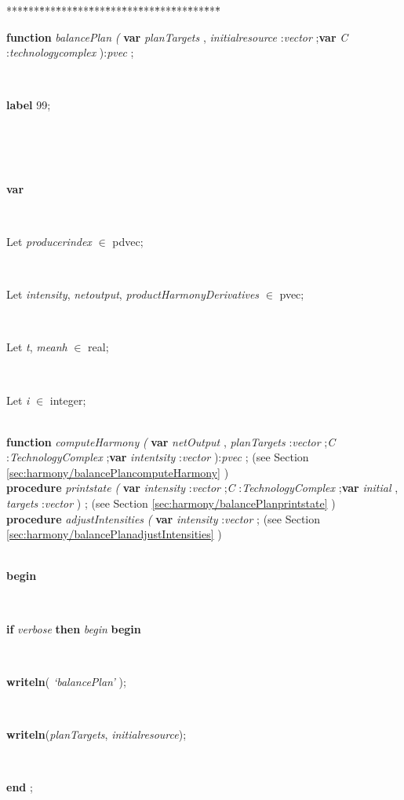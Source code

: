\begin{tabbing}
***\=***\=***\=***\=***\=***\=***\=***\=***\=***\=***\=***\=***\=\kill
\parbox{14cm}{\textsf{\textbf{function}  \textit{balancePlan} \textit{(}   \textbf{var}   \textit{planTargets} , \textit{initialresource} :\textit{vector}  ;\textbf{var}  \textit{C} :\textit{technologycomplex} ):\textit{pvec} ;}}\\
\parbox{14cm}{\textsf{\textbf{label}  99;}}\\
\\
\\
\+\parbox{14cm}{\textsf{\textbf{var} }}\\
\parbox{14cm}{\textsf{Let \textit{producerindex} $\in$ pdvec;}}\\
\parbox{14cm}{\textsf{Let \textit{intensity}, \textit{netoutput}, \textit{productHarmonyDerivatives} $\in$ pvec;}}\\
\parbox{14cm}{\textsf{Let \textit{t}, \textit{meanh} $\in$ real;}}\\
\parbox{14cm}{\textsf{Let \textit{i} $\in$ integer;}}\\
\<\textsf{\textbf{function}   \textit{computeHarmony}  \textit{(} \textbf{var}  \textit{netOutput} ,  \textit{planTargets} :\textit{vector} ;\textit{C} :\textit{TechnologyComplex}  ;\textbf{var}   \textit{intentsity} :\textit{vector}  ):\textit{pvec} ;} (see Section \ref{sec:harmony/balancePlancomputeHarmony} )\\
\<\textsf{\textbf{procedure}  \textit{printstate} \textit{(} \textbf{var}  \textit{intensity} :\textit{vector} ;\textit{C} :\textit{TechnologyComplex} ;\textbf{var}   \textit{initial} ,  \textit{targets} :\textit{vector} ) ;} (see Section \ref{sec:harmony/balancePlanprintstate} )\\
\<\textsf{\textbf{procedure}  \textit{adjustIntensities} \textit{(} \textbf{var}  \textit{intensity} :\textit{vector} ;} (see Section \ref{sec:harmony/balancePlanadjustIntensities} )\\
\\
\-\<\+\parbox{14cm}{\textsf{\textbf{begin} }}\\
\+\<\parbox{14cm}{\textsf {\textbf {if } \textsf{\textit{verbose}} \textbf{ then } \textsf{\textit{begin}} \textbf{ begin } }}\\
\parbox{14cm}{\textsf{\textbf{writeln}(\textit{\textrm{\textup { `balancePlan' } }})}; }\\
\parbox{14cm}{\textsf{\textbf{writeln}(\textit{planTargets}, \textit{initialresource})}; }\\
\<\-\parbox{14cm}{\textsf{\textbf{end} ;}}\\

\end{tabbing}
